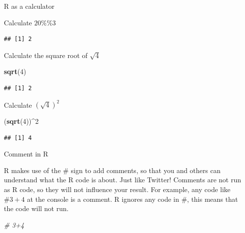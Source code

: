 \documentclass[
  ignorenonframetext,
]{beamer}
\newenvironment{Shaded}{\begin{snugshade}}{\end{snugshade}}
\newcommand{\CommentTok}[1]{\textcolor[rgb]{0.56,0.35,0.01}{\textit{#1}}}
\newcommand{\DecValTok}[1]{\textcolor[rgb]{0.00,0.00,0.81}{#1}}
\newcommand{\KeywordTok}[1]{\textcolor[rgb]{0.13,0.29,0.53}{\textbf{#1}}}
\newcommand{\NormalTok}[1]{#1}
\newcommand{\OperatorTok}[1]{\textcolor[rgb]{0.81,0.36,0.00}{\textbf{#1}}}
\newcommand{\StringTok}[1]{\textcolor[rgb]{0.31,0.60,0.02}{#1}}
\begin{document}
\begin{frame}[fragile]{R as a calculator}
\protect\hypertarget{r-as-a-calculator-2}{}

Calculate \(20\%\%3\)

\begin{Shaded}
\end{Shaded}

\begin{verbatim}
## [1] 2
\end{verbatim}

Calculate the square root of \(\sqrt{4}\)

\begin{Shaded}
\begin{Highlighting}[]
\KeywordTok{sqrt}\NormalTok{(}\DecValTok{4}\NormalTok{)}
\end{Highlighting}
\end{Shaded}

\begin{verbatim}
## [1] 2
\end{verbatim}

Calculate \((\sqrt{4})^2\)

\begin{Shaded}
\begin{Highlighting}[]
\NormalTok{(}\KeywordTok{sqrt}\NormalTok{(}\DecValTok{4}\NormalTok{))}\OperatorTok{^}\DecValTok{2}
\end{Highlighting}
\end{Shaded}

\begin{verbatim}
## [1] 4
\end{verbatim}

\end{frame}

\begin{frame}[fragile]{Comment in R}
\protect\hypertarget{comment-in-r}{}

R makes use of the \# sign to add comments, so that you and others can
understand what the R code is about. Just like Twitter! Comments are not
run as R code, so they will not influence your result. For example, any
code like \(\#3 + 4\) at the console is a comment. R ignores any code in
\#, this means that the code will not run.

\begin{Shaded}
\begin{Highlighting}[]
\CommentTok{# 3+4}
\end{Highlighting}
\end{Shaded}

\end{frame}
\end{document}
